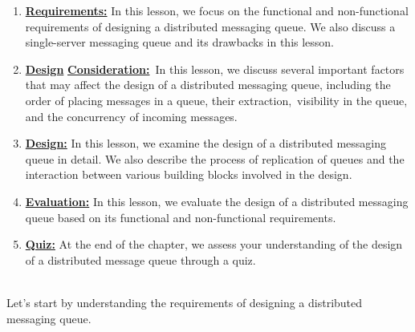 \begin{enumerate}
\item
\protect{}\label{c-5qjrOsCCedZILD7ME_B}
\href{https://www.educative.io/courses/grokking-the-system-design-interview/requirements-of-a-distributed-messaging-queues-design}{\textbf{Requirements:}} In this lesson, we focus on the functional and non-functional requirements of designing a distributed messaging queue. We also discuss a single-server messaging queue and its drawbacks in this lesson.
\item
\protect{}\label{YhvJpDY1jwGbWir7c6ugq}
\href{https://www.educative.io/courses/grokking-the-system-design-interview/considerations-of-a-distributed-messaging-queues-design}{\textbf{Design}} \href{https://www.educative.io/courses/grokking-the-system-design-interview/considerations-of-a-distributed-messaging-queues-design}{\textbf{Consideration:}}~In this lesson, we discuss several important factors that may affect the design of a distributed messaging queue, including the order of placing messages in a queue, their extraction,~visibility in the queue, and the concurrency of incoming messages.
\item
\protect{}\label{aFo2iX_RVCD_GnLuoYsNU}
\href{https://www.educative.io/courses/grokking-the-system-design-interview/design-of-a-distributed-messaging-queue-part-1}{\textbf{Design:}} In this lesson, we examine the design of a distributed messaging queue in detail. We also describe the process of replication of queues and the interaction between various building blocks involved in the design.
\item
\protect{}\label{VwscFyBtJt-zza7_CxhaK}
\href{https://www.educative.io/courses/grokking-the-system-design-interview/evaluation-of-a-distributed-messaging-queues-design}{\textbf{Evaluation:}} In this lesson, we evaluate the design of a distributed messaging queue based on its functional and non-functional requirements.
\item
\protect{}\label{KqiluM22Gr2JkAlmreYTV}
\href{https://www.educative.io/courses/grokking-the-system-design-interview/quiz-on-the-distributed-messaging-queues-design}{\textbf{Quiz:}} At the end of the chapter, we assess your understanding of the design of a distributed message queue through a quiz.
\end{enumerate}
\\
Let's start by understanding the requirements of designing a distributed messaging queue.


